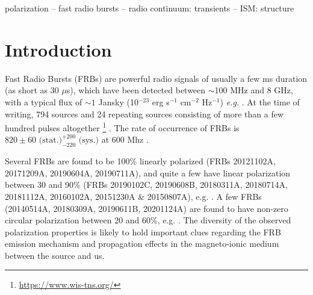 \documentclass[fleqn,usenatbib]{mnras}
\begin{document}
	\begin{keywords}
		polarization -- fast radio bursts -- radio continuum: transients -- ISM: structure
	\end{keywords}
	
	
	
	\section{Introduction}
	\label{sec:Intro}
	Fast Radio Bursts (FRBs) are powerful radio signals of usually a few ms duration (as short as 30 $\mu$s), which have been detected between $\sim$100 MHz and 8 GHz, with a typical flux of $\sim 1$ Jansky (10$^{-23}$ erg s$^{-1}$ cm$^{-2}$ Hz$^{-1}$) {\it e.g.} \cite{Lorimer+07,Thornton+13,Spitler2014,Petroff2016,Bannister2017,Law+17,Chatterjee+17,Marcote2017,Tendulkar+17,Gajjar2018,Michilli+18,Shannon2018,Oslowski2019,Kocz2019,Bannister+19,CHIME2019,CHIME2019b,Ravi2019,Ravi2019b,CHIME_1st_cat}.
	At the time of writing, 794 sources and 24 repeating sources consisting of more than a few hundred pulses altogether \footnote{\url{https://www.wis-tns.org/}} \citep{Spitler+16,CHIME2019,Kumar2019,CHIME_repeaters,CHIME_1st_cat}. The rate of occurrence of FRBs is $820 \pm 60\mbox{ (stat.)}^{+200}_{-220}\mbox{ (sys.)}$ at 600 Mhz \citep{CHIME_1st_cat}.

	
	Several FRBs are found to be 100\% linearly polarized (FRBs 20121102A, 20171209A, 20190604A, 20190711A), and quite a few have linear polarization between 30 and 90\% (FRBs 20190102C, 20190608B, 20180311A, 20180714A, 20181112A, 20160102A, 20151230A \& 20150807A), e.g. \cite{Michilli+18,Oslowski2019,CHIME_repeaters,Cho2020,Luo2020}. A few FRBs (20140514A, 20180309A, 20190611B, 20201124A) are found to have non-zero circular polarization between 20 and 60\%, e.g. \cite{Petroff+2014,Oslowski2019,Day+2020,Hilmarsson2021}. The diversity of the observed polarization properties is likely to hold important clues regarding the FRB emission mechanism and propagation effects in the magneto-ionic medium between the source and us.
	
\end{document}
